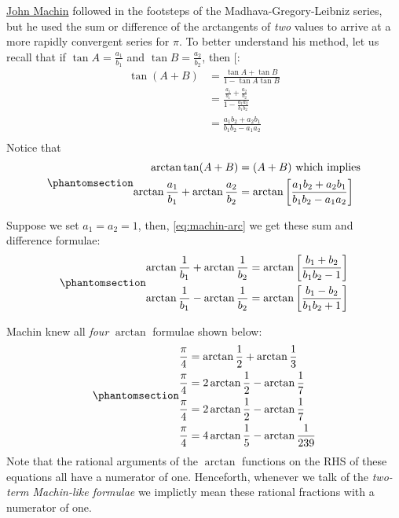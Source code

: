\documentclass[
  a4paper,
]{article}
\begin{document}
\href{https://en.wikipedia.org/wiki/John_Machin}{John Machin} followed
in the footsteps of the Madhava-Gregory-Leibniz series, but he used the
sum or difference of the arctangents of \emph{two} values to arrive at a
more rapidly convergent series for \(\pi\). To better understand his
method, let us recall that if \(\tan A = \frac{a_1}{b_1}\) and
\(\tan B = \frac{a_2}{b_2}\), then
{[}\citeproc{ref-libre-inv-trig-deriv}{23}{]}: \[
\begin{aligned}
\tan(A + B) &= \frac{\tan A + \tan B}{1 - \tan A\tan B}\\
&= \frac{\frac{a_{1}}{b_{1}} + \frac{a_{2}}{b_{2}}}{1 - \frac{a_{1}a_{2}}{b_{1}b_{2}}}\\
&= \frac{a_{1}b_{2} + a_{2}b_{1}}{b_{1}b_{2} - a_{1}a_{2}}\\
\end{aligned}
\] Notice that \begin{equation}\phantomsection\label{eq:machin-arc}{
\begin{aligned}
\arctan\tan(A+B) &= (A + B) \mbox { which implies}\\
\arctan\frac{a_1}{b_1}  + \arctan\frac{a_2}{b_2} &= \arctan\left[\frac{a_{1}b_{2} + a_{2}b_{1}}{b_{1}b_{2} - a_{1}a_{2}}\right]\\
\end{aligned}
}\end{equation}

Suppose we set \(a_{1} = a_{2} = 1\), then, \cref{eq:machin-arc} we get
these sum and difference formulae:
\begin{equation}\phantomsection\label{eq:sum-diff-arct}{
\begin{aligned}
\arctan\frac{1}{b_1}  + \arctan\frac{1}{b_2} &= \arctan\left[\frac{b_{1} + b_{2}}
{b_{1}b_{2} - 1}\right]\\
\arctan\frac{1}{b_1}  - \arctan\frac{1}{b_2} &= \arctan\left[\frac{b_{1} - b_{2}}
{b_{1}b_{2} + 1}\right]
\end{aligned}
}\end{equation}

Machin knew all \emph{four} \(\arctan\) formulae shown below:
\begin{equation}\phantomsection\label{eq:machin}{
\begin{aligned}
\frac{\pi}{4} &= \arctan\frac{1}{2} + \arctan\frac{1}{3}\\
\frac{\pi}{4} &= 2\arctan\frac{1}{2} - \arctan\frac{1}{7}\\
\frac{\pi}{4} &= 2\arctan\frac{1}{2} - \arctan\frac{1}{7}\\
\frac{\pi}{4} &= 4\arctan\frac{1}{5} - \arctan\frac {1}{239}
\end{aligned}
}\end{equation} Note that the rational arguments of the \(\arctan\)
functions on the RHS of these equations all have a numerator of one.
Henceforth, whenever we talk of the \emph{two-term Machin-like formulae}
we implictly mean these rational fractions with a numerator of one.
\end{document}
